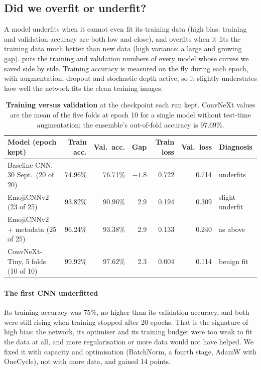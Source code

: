 \subsection{Did we overfit or underfit?}
\label{sec:fit}
A model underfits when it cannot even fit its training data (high bias: training and validation accuracy are both low and close), and overfits when it fits the training data much better than new data (high variance: a large and growing gap).  puts the training and validation numbers of every model whose curves we saved side by side. Training accuracy is measured on the fly during each epoch, with augmentation, dropout and stochastic depth active, so it slightly understates how well the network fits the clean training images.

\begin{table}[t]
\centering\small
\caption{\textbf{Training versus validation} at the checkpoint each run kept\ver. ConvNeXt values are the mean of the five folds at epoch 10 for a single model without test-time augmentation; the ensemble's out-of-fold accuracy is 97.69\%.}
\label{tab:fit}
\setlength{\tabcolsep}{4.5pt}
\begin{tabular}{@{}lrrrrrl@{}}
\toprule
Model (epoch kept) & Train acc. & Val.\ acc. & Gap & Train loss & Val.\ loss & Diagnosis\\
\midrule
Baseline CNN, 30 Sept.\ (20 of 20) & 74.96\% & 76.71\% & $-1.8$ & 0.722 & 0.714 & underfits\\
EmojiCNNv2 (23 of 25) & 93.82\% & 90.96\% & 2.9 & 0.194 & 0.309 & slight underfit\\
EmojiCNNv2 + metadata (25 of 25) & 96.24\% & 93.38\% & 2.9 & 0.133 & 0.240 & as above\\
ConvNeXt-Tiny, 5 folds (10 of 10) & 99.92\% & 97.62\% & 2.3 & 0.004 & 0.114 & benign fit\\
\bottomrule
\end{tabular}
\end{table}

\paragraph{The first CNN underfitted} Its training accuracy was 75\%, no higher than its validation accuracy, and both were still rising when training stopped after 20 epochs. That is the signature of high bias: the network, its optimiser and its training budget were too weak to fit the data at all, and more regularisation or more data would not have helped. We fixed it with capacity and optimisation (BatchNorm, a fourth stage, AdamW with OneCycle), not with more data, and gained 14 points.

